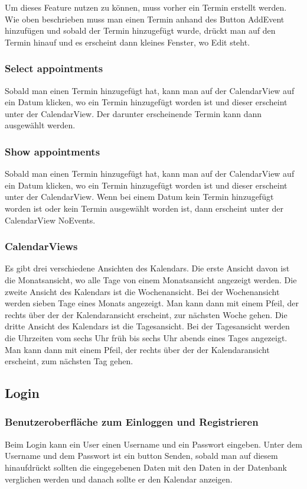 \documentclass[12pt]{scrartcl}
\begin{document}
        Um dieses Feature nutzen zu können, muss vorher ein Termin erstellt werden. Wie oben beschrieben muss man einen Termin
        anhand des Button AddEvent hinzufügen und sobald der Termin hinzugefügt wurde, drückt man auf den Termin hinauf und
        es erscheint dann kleines Fenster, wo Edit steht.   

    \subsubsection{Select appointments}
        Sobald man einen Termin hinzugefügt hat, kann man auf der CalendarView auf ein Datum klicken, wo ein Termin
        hinzugefügt worden ist und dieser erscheint unter der CalendarView. Der darunter erscheinende Termin kann dann 
        ausgewählt werden.
    
    \subsubsection{Show appointments}
        Sobald man einen Termin hinzugefügt hat, kann man auf der CalendarView auf ein Datum klicken, wo ein Termin
        hinzugefügt worden ist und dieser erscheint unter der CalendarView. Wenn bei einem Datum kein Termin hinzugefügt    
        worden ist oder kein Termin ausgewählt worden ist, dann erscheint unter der CalendarView NoEvents.
            
    \subsubsection{CalendarViews}
        Es gibt drei verschiedene Ansichten des Kalendars. Die erste Ansicht davon ist die Monatsansicht, wo alle Tage von
        einem Monatsansicht angezeigt werden. Die zweite Ansicht des Kalendars ist die Wochenansicht. Bei der Wochenansicht
        werden sieben Tage eines Monats angezeigt. Man kann dann mit einem Pfeil, der rechts über der der Kalendaransicht
        erscheint, zur nächsten Woche gehen. Die dritte Ansicht des Kalendars ist die Tagesansicht. Bei der Tagesansicht
        werden die Uhrzeiten vom sechs Uhr früh bis sechs Uhr abends eines Tages angezeigt. Man kann dann mit einem Pfeil, 
        der rechts über der der Kalendaransicht erscheint, zum nächsten Tag gehen.
    \subsection{Login}
    \subsubsection{Benutzeroberfläche zum Einloggen und Registrieren}
        Beim Login kann ein User einen Username und ein Passwort eingeben.
        Unter dem Username und dem Passwort ist ein button Senden, sobald man auf diesem hinaufdrückt sollten die eingegebenen
        Daten mit den Daten in der Datenbank verglichen werden und danach sollte er den Kalendar anzeigen.
\end{document}
